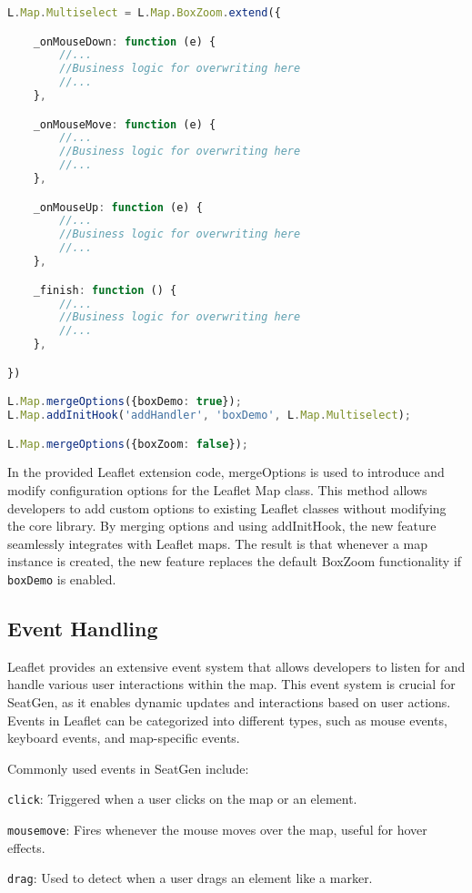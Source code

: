 \begin{lstlisting}[language=Typescript, caption={Modifying Leaflet Features},label={lst:leaflet-modification}]
L.Map.Multiselect = L.Map.BoxZoom.extend({

    _onMouseDown: function (e) {
        //...
        //Business logic for overwriting here
        //...
    },

    _onMouseMove: function (e) {
        //...
        //Business logic for overwriting here
        //...
    },

    _onMouseUp: function (e) {
        //...
        //Business logic for overwriting here
        //...
    },

    _finish: function () {
        //...
        //Business logic for overwriting here
        //...
    },

})

L.Map.mergeOptions({boxDemo: true});
L.Map.addInitHook('addHandler', 'boxDemo', L.Map.Multiselect);

L.Map.mergeOptions({boxZoom: false});

\end{lstlisting}


In the provided Leaflet extension code, mergeOptions is used to introduce and modify configuration options for the Leaflet Map class. This method allows developers to add custom options to existing Leaflet classes without modifying the core library. By merging options and using addInitHook, the new feature seamlessly integrates with Leaflet maps. The result is that whenever a map instance is created, the new feature replaces the default BoxZoom functionality if \texttt{boxDemo} is enabled.

\subsection{Event Handling}
Leaflet provides an extensive event system that allows developers to listen for and handle various user interactions within the map. This event system is crucial for SeatGen, as it enables dynamic updates and interactions based on user actions. Events in Leaflet can be categorized into different types, such as mouse events, keyboard events, and map-specific events.

Commonly used events in SeatGen include:
\begin{compactitem}
\item \texttt{click}: Triggered when a user clicks on the map or an element.
\item \texttt{mousemove}: Fires whenever the mouse moves over the map, useful for hover effects.
\item \texttt{drag}: Used to detect when a user drags an element like a marker.
\end{compactitem}

